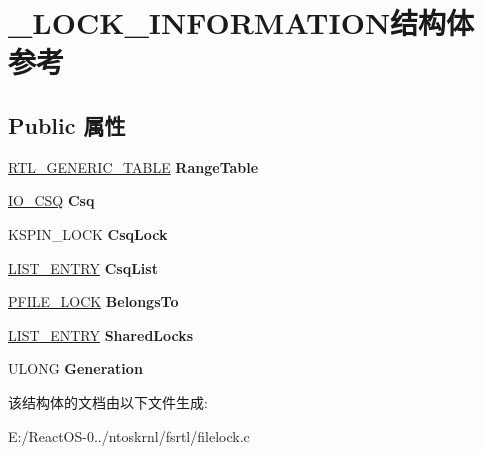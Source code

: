 \hypertarget{struct___l_o_c_k___i_n_f_o_r_m_a_t_i_o_n}{}\section{\+\_\+\+L\+O\+C\+K\+\_\+\+I\+N\+F\+O\+R\+M\+A\+T\+I\+O\+N结构体 参考}
\label{struct___l_o_c_k___i_n_f_o_r_m_a_t_i_o_n}
\subsection*{Public 属性}
\begin{DoxyCompactItemize}
\item 
\mbox{\label{struct___l_o_c_k___i_n_f_o_r_m_a_t_i_o_n_a9a9714a9411d73e93dc7801b026b4ec2}} 
\hyperlink{struct___r_t_l___g_e_n_e_r_i_c___t_a_b_l_e}{R\+T\+L\+\_\+\+G\+E\+N\+E\+R\+I\+C\+\_\+\+T\+A\+B\+LE} {\bfseries Range\+Table}
\item 
\mbox{\label{struct___l_o_c_k___i_n_f_o_r_m_a_t_i_o_n_a5c25f5a859217f3005aeb223b541dac5}} 
\hyperlink{struct___i_o___c_s_q}{I\+O\+\_\+\+C\+SQ} {\bfseries Csq}
\item 
\mbox{\label{struct___l_o_c_k___i_n_f_o_r_m_a_t_i_o_n_a5be53a78bd82d3bf5b386804f5d3ef76}} 
K\+S\+P\+I\+N\+\_\+\+L\+O\+CK {\bfseries Csq\+Lock}
\item 
\mbox{\label{struct___l_o_c_k___i_n_f_o_r_m_a_t_i_o_n_aa8555b1186c73958921faeb556a49540}} 
\hyperlink{struct___l_i_s_t___e_n_t_r_y}{L\+I\+S\+T\+\_\+\+E\+N\+T\+RY} {\bfseries Csq\+List}
\item 
\mbox{\label{struct___l_o_c_k___i_n_f_o_r_m_a_t_i_o_n_a9d226a198aa8ee38a3f19c95df0fdcd0}} 
\hyperlink{struct___f_i_l_e___l_o_c_k}{P\+F\+I\+L\+E\+\_\+\+L\+O\+CK} {\bfseries Belongs\+To}
\item 
\mbox{\label{struct___l_o_c_k___i_n_f_o_r_m_a_t_i_o_n_ac26818b022c9368b1b5a9bc019bad8c3}} 
\hyperlink{struct___l_i_s_t___e_n_t_r_y}{L\+I\+S\+T\+\_\+\+E\+N\+T\+RY} {\bfseries Shared\+Locks}
\item 
\mbox{\label{struct___l_o_c_k___i_n_f_o_r_m_a_t_i_o_n_a1570d2f25434a24087c10495b55f1d8f}} 
U\+L\+O\+NG {\bfseries Generation}
\end{DoxyCompactItemize}


该结构体的文档由以下文件生成\+:\begin{DoxyCompactItemize}
\item 
E\+:/\+React\+O\+S-\/0../ntoskrnl/fsrtl/filelock.\+c\end{DoxyCompactItemize}
